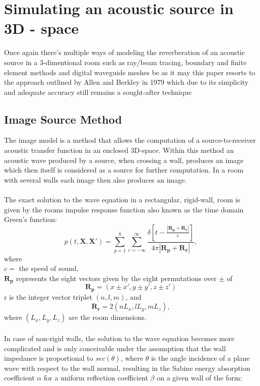 \section{Simulating an acoustic source in 3D - space}
Once again there's multiple ways of modeling the reverberation of an acoustic source in a 3-dimentional room such as ray/beam tracing, boundary and finite element methods and digital waveguide meshes be as it may this paper resorts to the approach outlined by Allen and Berkley in 1979 which due to its simplicity and adequate accuracy still remains a sought-after technique \cite{Samarasinghe2018}

\subsection{Image Source Method}
The image model is a method that allows the computation of a source-to-receiver acoustic transfer function in an enclosed 3D-space. Within this method an acoustic wave produced by a source, when crossing a wall, produces an image which then itself is considered as a source for further computation. In a room with several walls each image then also produces an image.\cite{Allen1979}
\\\\
The exact solution to the wave equation in a rectangular, rigid-wall, room is given by the rooms impulse response function also known as the time domain Green's function\cite{Allen1979}:
\begin{equation}
    p(t,\mathbf{X},\mathbf{X'})=\sum_{p=1}^8\sum_{r=-\infty}^\infty\frac{\delta[t-\frac{|\mathbf{R_p}+\mathbf{R_r}|}{c}]}{4\pi|\mathbf{R_p}+\mathbf{R_r}|},
\end{equation}
where\\ 
$c=$ the speed of sound,\\
$\mathbf{R_p}$ represents the eight vectors given by the eight permutations over $\pm$ of
\begin{equation}
    \mathbf{R_p}=(x\pm x', y\pm y', z\pm z')
\end{equation}
r is the integer vector triplet $(n,l,m)$, and
\begin{equation}
    \mathbf{R_r}=2(nL_x, lL_y, mL_z),
\end{equation}
where $(L_x, L_y, L_z)$ are the room dimensions.
\\
\\
In case of non-rigid walls, the solution to the wave equation becomes more complicated and is only conceivable under the assumption that the wall impedance is proportional to $sec(\theta)$, where $\theta$ is the angle incidence of a plane wave with respect to the wall normal, resulting in the Sabine energy absorption coefficient $\alpha$ for a uniform reflection coefficient $\beta$ on a given wall of the form\cite{Allen1979}:
